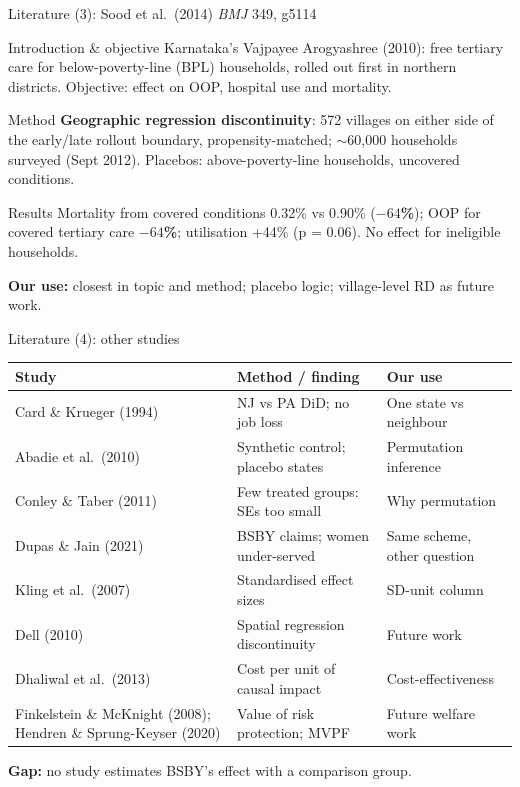 \documentclass[compress]{beamer}
\newcommand{\hl}[1]{\textcolor{IITRRed}{\textbf{#1}}}
\begin{document}
\begin{frame}[t]{Literature (3): Sood et al.\ (2014)}
\scriptsize\emph{BMJ} 349, g5114\par\vspace{2pt}
\footnotesize
\begin{block}{Introduction \& objective}
Karnataka's Vajpayee Arogyashree (2010): free tertiary care for below-poverty-line (BPL) households, rolled out first in northern districts. Objective: effect on OOP, hospital use and mortality.
\end{block}
\begin{block}{Method}
\textbf{Geographic regression discontinuity}: 572 villages on either side of the early/late rollout boundary, propensity-matched; $\sim$60,000 households surveyed (Sept 2012). Placebos: above-poverty-line households, uncovered conditions.
\end{block}
\begin{block}{Results}
Mortality from covered conditions 0.32\% vs 0.90\% (\textbf{$-64$\%}); OOP for covered tertiary care \textbf{$-64$\%}; utilisation +44\% (p = 0.06). No effect for ineligible households.
\end{block}
\hl{Our use:} closest in topic and method; placebo logic; village-level RD as future work.
\end{frame}

\begin{frame}[t]{Literature (4): other studies}
\scriptsize
\renewcommand{\arraystretch}{1.05}
\begin{tabular}{@{}p{3.1cm}p{3.6cm}p{3.1cm}@{}}
\toprule
\textbf{Study} & \textbf{Method / finding} & \textbf{Our use} \\
\midrule
Card \& Krueger (1994) & NJ vs PA DiD; no job loss & One state vs neighbour \\
Abadie et al.\ (2010) & Synthetic control; placebo states & Permutation inference \\
Conley \& Taber (2011) & Few treated groups: SEs too small & Why permutation \\
Dupas \& Jain (2021) & BSBY claims; women under-served & Same scheme, other question \\
Kling et al.\ (2007) & Standardised effect sizes & SD-unit column \\
Dell (2010) & Spatial regression discontinuity & Future work \\
Dhaliwal et al.\ (2013) & Cost per unit of causal impact & Cost-effectiveness \\
Finkelstein \& McKnight (2008); Hendren \& Sprung-Keyser (2020) & Value of risk protection; MVPF & Future welfare work \\
\bottomrule
\end{tabular}
\vspace{6pt}

\small\hl{Gap:} no study estimates BSBY's effect with a comparison group.
\end{frame}
\end{document}
